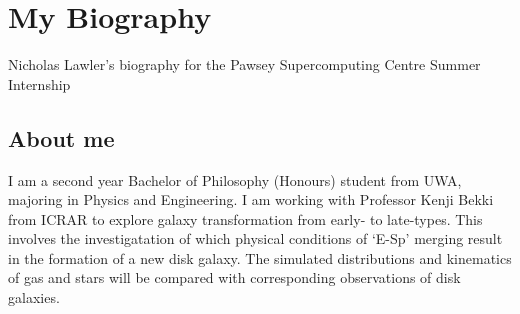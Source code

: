 \section{My Biography}
Nicholas Lawler's biography for the Pawsey Supercomputing Centre Summer Internship
\subsection{About me}
I am a second year Bachelor of Philosophy (Honours) student from UWA, majoring in Physics and Engineering.
I am working with Professor Kenji Bekki from ICRAR to explore galaxy transformation from early- to late-types. This involves the investigatation of which physical conditions of `E-Sp’ merging result in the formation of a new disk galaxy. The simulated distributions and kinematics of gas and stars will be compared with corresponding observations of disk galaxies.

